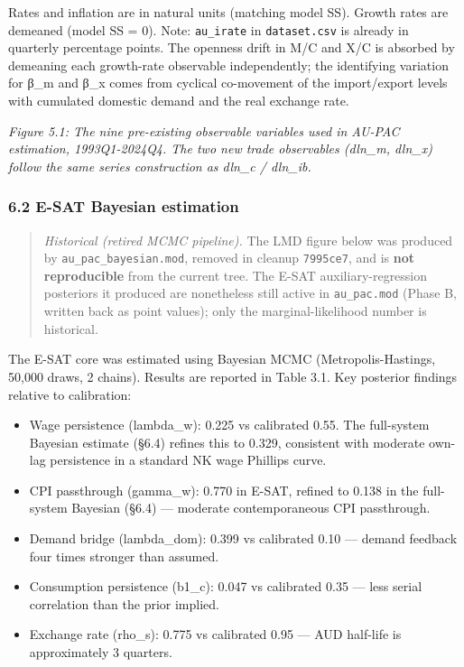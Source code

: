 \documentclass[
]{article}
\newcounter{none} %
\providecommand{\tightlist}{%
  \setlength{\itemsep}{0pt}\setlength{\parskip}{0pt}}
\begin{document}
Rates and inflation are in natural units (matching model SS). Growth
rates are demeaned (model SS = 0). Note: \texttt{au\_irate} in
\texttt{dataset.csv} is already in quarterly percentage points. The
openness drift in M/C and X/C is absorbed by demeaning each growth-rate
observable independently; the identifying variation for β\_m and β\_x
comes from cyclical co-movement of the import/export levels with
cumulated domestic demand and the real exchange rate.

\emph{Figure 5.1: The nine pre-existing observable variables used in
AU-PAC estimation, 1993Q1-2024Q4. The two new trade observables (dln\_m,
dln\_x) follow the same series construction as dln\_c / dln\_ib.}

\subsubsection{6.2 E-SAT Bayesian
estimation}\label{e-sat-bayesian-estimation}

\begin{quote}
\emph{Historical (retired MCMC pipeline).} The LMD figure below was
produced by \texttt{au\_pac\_bayesian.mod}, removed in cleanup
\texttt{7995ce7}, and is \textbf{not reproducible} from the current
tree. The E-SAT auxiliary-regression posteriors it produced are
nonetheless still active in \texttt{au\_pac.mod} (Phase B, written back
as point values); only the marginal-likelihood number is historical.
\end{quote}

The E-SAT core was estimated using Bayesian MCMC (Metropolis-Hastings,
50,000 draws, 2 chains). Results are reported in Table 3.1. Key
posterior findings relative to calibration:

\begin{itemize}
\tightlist
\item
  Wage persistence (lambda\_w): 0.225 vs calibrated 0.55. The
  full-system Bayesian estimate (§6.4) refines this to 0.329, consistent
  with moderate own-lag persistence in a standard NK wage Phillips
  curve.
\item
  CPI passthrough (gamma\_w): 0.770 in E-SAT, refined to 0.138 in the
  full-system Bayesian (§6.4) --- moderate contemporaneous CPI
  passthrough.
\item
  Demand bridge (lambda\_dom): 0.399 vs calibrated 0.10 --- demand
  feedback four times stronger than assumed.
\item
  Consumption persistence (b1\_c): 0.047 vs calibrated 0.35 --- less
  serial correlation than the prior implied.
\item
  Exchange rate (rho\_s): 0.775 vs calibrated 0.95 --- AUD half-life is
  approximately 3 quarters.
\end{itemize}
\end{document}
